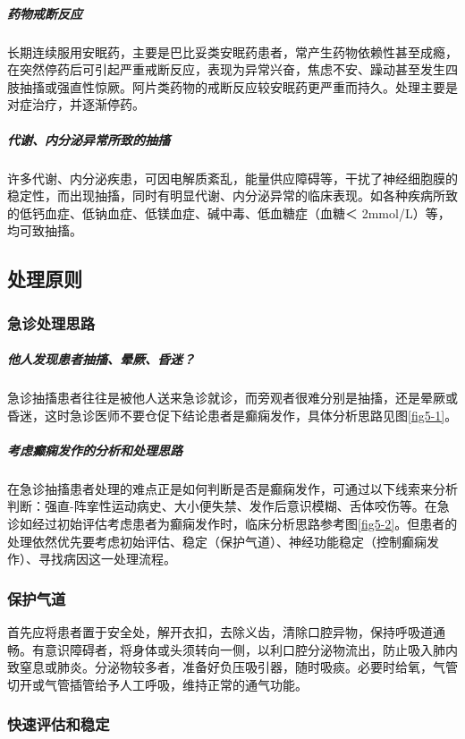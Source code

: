\subparagraph{药物戒断反应}

长期连续服用安眠药，主要是巴比妥类安眠药患者，常产生药物依赖性甚至成瘾，在突然停药后可引起严重戒断反应，表现为异常兴奋，焦虑不安、躁动甚至发生四肢抽搐或强直性惊厥。阿片类药物的戒断反应较安眠药更严重而持久。处理主要是对症治疗，并逐渐停药。

\subparagraph{代谢、内分泌异常所致的抽搐}

许多代谢、内分泌疾患，可因电解质紊乱，能量供应障碍等，干扰了神经细胞膜的稳定性，而出现抽搐，同时有明显代谢、内分泌异常的临床表现。如各种疾病所致的低钙血症、低钠血症、低镁血症、碱中毒、低血糖症（血糖＜
2mmol/L）等，均可致抽搐。

\subsection{处理原则}

\subsubsection{急诊处理思路}

\subparagraph{他人发现患者抽搐、晕厥、昏迷？}

急诊抽搐患者往往是被他人送来急诊就诊，而旁观者很难分别是抽搐，还是晕厥或昏迷，这时急诊医师不要仓促下结论患者是癫痫发作，具体分析思路见图\ref{fig5-1}。

\subparagraph{考虑癫痫发作的分析和处理思路}

在急诊抽搐患者处理的难点正是如何判断是否是癫痫发作，可通过以下线索来分析判断：强直-阵挛性运动病史、大小便失禁、发作后意识模糊、舌体咬伤等。在急诊如经过初始评估考虑患者为癫痫发作时，临床分析思路参考图\ref{fig5-2}。但患者的处理依然优先要考虑初始评估、稳定（保护气道）、神经功能稳定（控制癫痫发作）、寻找病因这一处理流程。

\subsubsection{保护气道}

首先应将患者置于安全处，解开衣扣，去除义齿，清除口腔异物，保持呼吸道通畅。有意识障碍者，将身体或头须转向一侧，以利口腔分泌物流出，防止吸入肺内致窒息或肺炎。分泌物较多者，准备好负压吸引器，随时吸痰。必要时给氧，气管切开或气管插管给予人工呼吸，维持正常的通气功能。

\subsubsection{快速评估和稳定}

